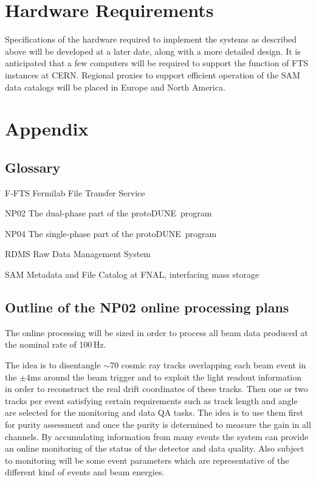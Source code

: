 \documentclass[pdftex,12pt,letter]{article}
\newcommand{\pd}{protoDUNE\ }
\begin{document}
\section{Hardware Requirements}
Specifications of the hardware required to implement the systems as described above will be developed at a later date, along with a more detailed
design. It is anticipated that a few computers will be required to support the function of FTS instances at CERN. Regional proxies to support efficient operation
of the SAM data catalogs will be placed in Europe and North America.


\newpage

\appendix
\section{Appendix}
\subsection{Glossary}
\begin{description}
\item{F-FTS} Fermilab File Transfer Service
\item{NP02} The dual-phase part of the \pd program
\item{NP04} The single-phase part of the \pd program
\item{RDMS} Raw Data Management System
\item{SAM} Metadata and File Catalog at FNAL, interfacing mass storage
\end{description}

\subsection{Outline of the NP02 online processing plans}
\label{sec:np02_online_processing}
The online processing will be sized in order to process all beam data produced at the nominal rate of 100\,Hz. 

The idea is to disentangle $\sim$70 cosmic ray tracks overlapping each beam event in the $\pm$4ms around the beam trigger
and to exploit the light readout information in order to reconstruct the real drift coordinates of these tracks.
Then one or two tracks per event satisfying certain requirements such as track length and angle are selected for the monitoring and
data QA tasks. The idea is to use them first for purity assessment and once the purity is determined to measure the gain in all
channels. By accumulating information from many events the system can provide an online monitoring of the status of the detector
and data quality. Also subject to monitoring will be some event parameters which are representative of the different kind of events and
beam energies.
\end{document}
